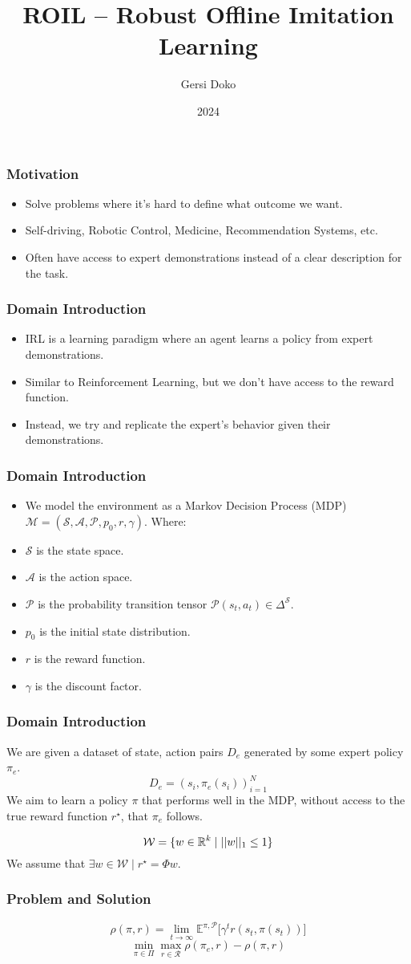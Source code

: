 \documentclass{beamer}
\title{ROIL -- Robust Offline Imitation Learning}
\author{Gersi Doko}
\institute{Department of Computer Science, University of New Hampshire}
\date{2024}
\begin{document}
\frame{\titlepage}

\begin{frame}
\frametitle{Motivation}
	\begin{itemize}
		\item Solve problems where it's hard to define what outcome we want.
		\item Self-driving, Robotic Control, Medicine, Recommendation Systems, etc.
		\item Often have access to expert demonstrations instead of a clear description for the task.
	\end{itemize}
\end{frame}

\begin{frame}
\frametitle{Domain Introduction}
	\begin{itemize}
		\item IRL is a learning paradigm where an agent learns a policy from expert demonstrations.
		\item Similar to Reinforcement Learning, but we don't have access to the reward function.
		\item Instead, we try and replicate the expert's behavior given their demonstrations.
	\end{itemize}
\end{frame}

\begin{frame}
	\frametitle{Domain Introduction}
	\begin{itemize}
		\item We model the environment as a Markov Decision Process (MDP) $\mathcal{M} = (\mathcal{S}, \mathcal{A}, \mathcal{P}, p_0, r, \gamma)$. Where:
		\item $\mathcal{S}$ is the state space.
		\item $\mathcal{A}$ is the action space.
		\item $\mathcal{P}$ is the probability transition tensor $\mathcal{P}(s_t, a_t) \in \Delta^\mathcal{S}$.
		\item $p_0$ is the initial state distribution.
		\item $r$ is the reward function.
		\item $\gamma$ is the discount factor.
	\end{itemize}
\end{frame}

\begin{frame}
	\frametitle{Domain Introduction}

	We are given a dataset of state, action pairs $D_e$ generated by some expert policy $\pi_e$.
	\[ D_e = (s_i, \pi_e(s_i))_{i=1}^N \]
	We aim to learn a policy $\pi$ that performs well in the MDP, without access to the true reward function $r^\star$,
	that $\pi_e$ follows.

	\[ \mathcal{W} = \lbrace w \in \mathbb{R}^k \mid \lvert \lvert w \rvert \rvert_1 \leq 1 \rbrace \]
	We assume that $\exists w \in \mathcal{W} \mid r^\star = \Phi w$.

\end{frame}

\begin{frame}
	\frametitle{Problem and Solution}
	\[ \rho(\pi, r) = \lim_{t \to \infty} \mathbb{E}^{\pi, \mathcal{P}} \lbrack \gamma^t r(s_t, \pi(s_t)) \rbrack \]
	\[ \min_{\pi \in \Pi} \max_{r \in \mathcal{R}} \rho(\pi_e, r) - \rho(\pi, r)\]
\end{frame}
\end{document}
